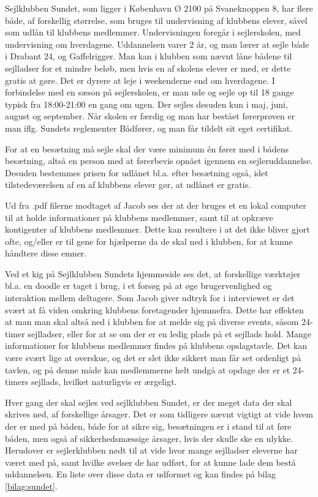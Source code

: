 Sejlklubben Sundet, som ligger i København Ø 2100 på Svaneknoppen 8, har flere både, af forskellig størrelse, som bruges
til undervisning af klubbens elever, såvel som udlån til klubbens medlemmer. Undervisningen foregår i sejlerskolen, med
undervisning om hverdagene. Uddannelsen varer 2 år, og man lærer at sejle både i Drabant 24, og
Gaffelrigger. Man kan i klubben som nævnt låne bådene
til sejlladser for et mindre beløb, men hvis en af skolens elever er med, er dette gratis at gøre. Det er dyrere at leje
i weekenderne end om hverdagene. I forbindelse med en sæson på sejlerskolen, er man ude og sejle op til 18 gange typisk
fra 18:00-21:00 en gang om ugen. Der sejles desuden kun i maj, juni, august og september. Når skolen er færdig og man
har bestået førerprøven er man iflg. Sundets reglementer Bådfører, og man får tildelt sit eget certifikat.

For at en besætning må sejle skal der være minimum én fører med i bådens besætning, altså en person med at førerbevis
opnået igennem en sejleruddannelse. Desuden bestemmes prisen for udlånet bl.a. efter besætning også, idet
tilstedeværelsen af en af klubbens elever gør, at udlånet er gratis.\citep{Sundet}

Ud fra .pdf filerne modtaget af Jacob ses der at der bruges et en lokal computer til at
holde informationer på klubbens medlemmer, samt til at opkræve kontigenter af klubbens medlemmer. Dette kan resultere i
at det ikke bliver gjort ofte, og/eller er til gene for hjælperne da de skal ned i klubben, for at kunne håndtere disse
emner.

Ved et kig på Sejlklubben Sundets hjemmeside \citep{SundetUdlaan} ses det, at forskellige værktøjer bl.a. en doodle er
taget i brug, i et forsøg på at øge brugervenlighed og interaktion mellem deltagere. Som Jacob giver udtryk for i
interviewet er det svært at få viden omkring klubbens foretagender hjemmefra. Dette har effekten at man man skal altså
ned i klubben for at melde sig på diverse events, såsom 24-timer sejlladser, eller for at se om der er en ledig plads på
et sejllads hold. Mange informationer for klubbens medlemmer findes på klubbens opslagstavle. Det kan være svært lige at
overskue, og det er slet ikke sikkert man får set ordenligt på tavlen, og på denne måde kan medlemmerne helt undgå at
opdage der er et 24-timers sejllads, hvilket naturligvis er ærgeligt.

Hver gang der skal sejles ved sejlklubben Sundet, er der meget data der skal skrives ned, af forskellige årsager. Det er
som tidligere nævnt vigtigt at vide hvem der er med på båden, både for at sikre sig, besætningen er i stand til at føre
båden, men også af sikkerhedsmæssige årsager, hvis der skulle ske en ulykke. Herudover er sejlerklubben nødt til at vide
hvor mange sejlladser eleverne har været med på, samt hvilke øvelser de har udført, for at kunne lade dem bestå
uddannelsen. En liste over disse data er udformet og kan findes på bilag \ref{bilag:sundet}.

